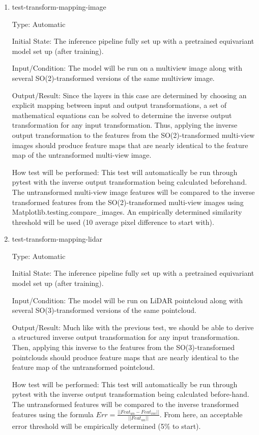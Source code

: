 \documentclass[12pt, titlepage]{article}
\begin{document}
\begin{enumerate}
  \item{test-transform-mapping-image\\}
  
  Type: Automatic
            
  Initial State: The inference pipeline fully set up with a pretrained equivariant model set up (after training).

  Input/Condition: The model will be run on a multiview image along with several SO(2)-transformed versions of the same multiview image.

  Output/Result: Since the layers in this case are determined by choosing an explicit mapping between input and output transformations, a set of mathematical equations can be solved to determine the inverse output transformation for any input transformation. Thus, applying the inverse output transformation to the features from the SO(2)-transformed multi-view images should produce feature maps that are nearly identical to the feature map of the untransformed multi-view image.

  How test will be performed: This test will automatically be run through pytest with the inverse output transformation being calculated beforehand. The untransformed multi-view image features will be compared to the inverse transformed features from the SO(2)-transformed multi-view images using Matplotlib.testing.compare\_images. An empirically determined similarity threshold will be used (10 average pixel difference to start with).
  
  \item{test-transform-mapping-lidar\\}
  
  Type: Automatic
            
  Initial State: The inference pipeline fully set up with a pretrained equivariant model set up (after training).

  Input/Condition: The model will be run on LiDAR pointcloud along with several SO(3)-transformed versions of the same pointcloud.

  Output/Result: Much like with the previous test, we should be able to derive a structured inverse output transformation for any input transformation. Then, applying this inverse to the features from the SO(3)-transformed pointclouds should produce feature maps that are nearly identical to the feature map of the untransformed pointcloud.

  How test will be performed: This test will automatically be run through pytest with the inverse output transformation being calculated before-hand. The untransformed features will be compared to the inverse transformed features using the formula $Err=\frac{||Feat_{un}-Feat_{inv}||}{||Feat_{un}||}$. From here, an acceptable error threshold will be empirically determined (5\% to start).

\end{enumerate}
  
\end{document}
